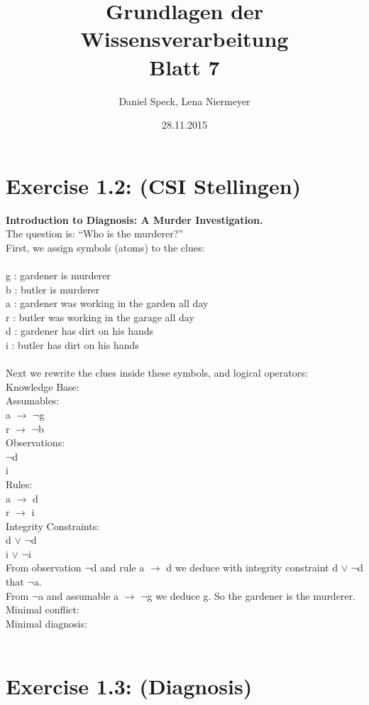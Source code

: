 \documentclass[10pt,a4paper]{article}
\title{\textbf{\huge Grundlagen der Wissensverarbeitung
		\\\Large Blatt 7}}
\author{Daniel Speck, Lena Niermeyer}
\date{28.11.2015}
\begin{document}
		
	\maketitle
		
	\section*{Exercise 1.2: (CSI Stellingen)}
	

\textbf{Introduction to Diagnosis: A Murder Investigation.}
\\
The question is: “Who is the murderer?” \\
First, we assign symbols (atoms) to the clues: \\
\\
g : gardener is murderer \\
b : butler is murderer \\
a : gardener was working in the garden all day \\
r : butler was working in the garage all day \\
d : gardener has dirt on his hands \\
i : butler has dirt on his hands \\
\\
Next we rewrite the clues inside these symbols, and logical operators: \\
Knowledge Base:\\
Assumables: \\
a $\rightarrow$ $\lnot$g \\
r $\rightarrow$ $\lnot$b \\
Observations: \\
$\lnot$d \\
i \\
Rules: \\
a $\rightarrow$ d \\
r $\rightarrow$ i \\
Integrity Constraints: \\
d $\lor$ $\lnot$d \\
i $\lor$ $\lnot$i \\
From observation $\lnot$d and rule a $\rightarrow$ d we deduce with integrity constraint d $\lor$ $\lnot$d that $\lnot$a. \\
From $\lnot$a and assumable a $\rightarrow$ $\lnot$g we deduce g. So the gardener is the murderer. \\
Minimal conflict: \\

Minimal diagnosis: \\
\\
\section*{Exercise 1.3: (Diagnosis)}
\end{document}
